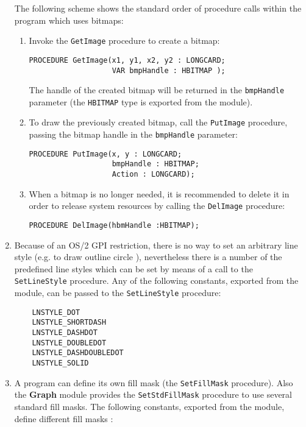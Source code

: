 \begin{enumerate}
      The following scheme shows the standard order of procedure calls within
      the program which uses bitmaps:

      \begin{enumerate}
      \item Invoke the \verb'GetImage' procedure to create a bitmap:

\begin{verbatim}
PROCEDURE GetImage(x1, y1, x2, y2 : LONGCARD; 
                   VAR bmpHandle : HBITMAP );
\end{verbatim}
            The handle of the created bitmap will be returned in the \verb'bmpHandle'
            parameter (the \verb'HBITMAP' type is exported from the module).

      \item To draw the previously created bitmap, call the \verb'PutImage' procedure,
            passing the bitmap handle in the \verb'bmpHandle' parameter:

\begin{verbatim}
PROCEDURE PutImage(x, y : LONGCARD; 
                   bmpHandle : HBITMAP;
                   Action : LONGCARD);
\end{verbatim}

      \item When a bitmap is no longer needed, it is recommended to delete it
            in order to release system resources by calling the 
            \verb'DelImage' procedure:

            \verb'PROCEDURE DelImage(hbmHandle :HBITMAP);'
      \end{enumerate}

\item Because of an OS/2 GPI restriction, there is no way to set an arbitrary line
      style (e.g. to draw outline circle ), nevertheless there is a number of
      the predefined line styles which can be set by means of a call to the
      \verb'SetLineStyle' procedure. Any of the following constants, exported from the
      module, can be passed to the \verb'SetLineStyle' procedure:

\begin{verbatim}
    LNSTYLE_DOT
    LNSTYLE_SHORTDASH
    LNSTYLE_DASHDOT
    LNSTYLE_DOUBLEDOT
    LNSTYLE_DASHDOUBLEDOT
    LNSTYLE_SOLID
\end{verbatim}

\item A program can define its own fill mask (the \verb'SetFillMask' procedure).
      Also the {\bf Graph} module provides the \verb'SetStdFillMask' procedure to use
      several standard fill masks. The following constants, exported from
      the module, define different fill masks :


\end{enumerate}
